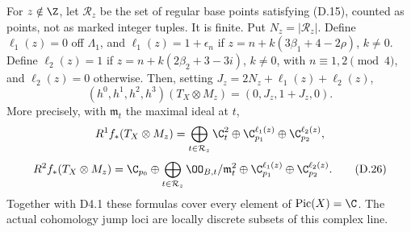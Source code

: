 \begin{proposition}\label{inv:D4.5}
For $z\notin\Z$, let $\mathcal R_z$ be the set of regular base
points satisfying (D.15), counted as points, not as marked integer
tuples. It is finite. Put $N_z=|\mathcal R_z|$. Define
$\ell_1(z)=0$ off $\Lambda_1$, and
$\ell_1(z)=1+\epsilon_n$ if
$z=n+k(3\beta_1+4-2\rho)$, $k\ne0$.
Define $\ell_2(z)=1$ if
$z=n+k(2\beta_2+3-3i)$, $k\ne0$, with
$n\equiv1,2\pmod4$, and $\ell_2(z)=0$ otherwise.
Then, setting $J_z=2N_z+\ell_1(z)+\ell_2(z)$,
\[
 \boxed{(h^0,h^1,h^2,h^3)(T_X\otimes M_z)=(0,J_z,1+J_z,0).} \tag{D.25}
\]
More precisely, with $\mathfrak m_t$ the maximal ideal at $t$,
\[
 R^1f_*(T_X\otimes M_z)=
   \bigoplus_{t\in\mathcal R_z}\C_t^2
      \oplus\C_{p_1}^{\ell_1(z)}\oplus\C_{p_2}^{\ell_2(z)},
\]
\[
 R^2f_*(T_X\otimes M_z)=\C_{p_0}\oplus
   \bigoplus_{t\in\mathcal R_z}\OO_{B,t}/\mathfrak m_t^2
      \oplus\C_{p_1}^{\ell_1(z)}\oplus\C_{p_2}^{\ell_2(z)}. \tag{D.26}
\]
Together with D4.1 these formulas cover every element of
$\operatorname{Pic}(X)=\C$. The actual cohomology jump loci are
locally discrete subsets of this complex line.
\end{proposition}
